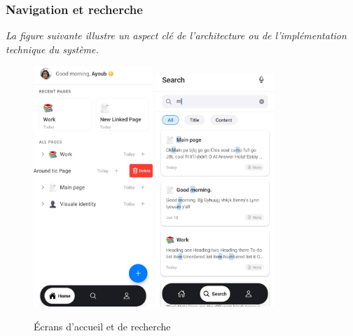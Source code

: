 \subsubsection{Navigation et recherche}
\noindent
\textit{La figure suivante illustre un aspect clé de l'architecture ou de l'implémentation technique du système.}
\begin{figure}[H]
    \centering
    \includegraphics[width=0.4\textwidth]{assets/docs/mobile/home-screen.png}
    \hfill
    \includegraphics[width=0.4\textwidth]{assets/docs/mobile/search-screeen.png}
    \caption{Écrans d'accueil et de recherche}
    \label{fig:mobile-home-search}
\end{figure}

